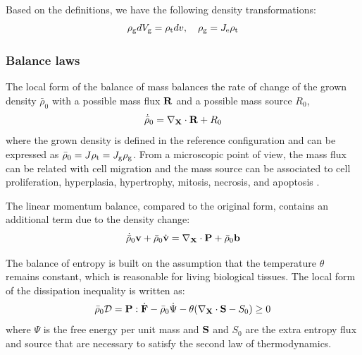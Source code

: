 Based on the definitions, we have the following density transformations:
\begin{equation} \label{eq:mass}
\rho_{\mathrm{g}} dV_{\mathrm{g}} = \rho_{\mathrm{t}} dv, \quad \rho_{\mathrm{g}} = J_{\mathrm{e}}\rho_{\mathrm{t}}
\end{equation}

\subsubsection{Balance laws}
The local form of the balance of mass balances the rate of change of the grown density ${\bar{\rho}}_0$ with 
a possible mass flux $\bold{R}$ and a possible mass source $R_0$,
\begin{equation}
\dot{\bar{\rho}}_0 = \nabla_\bold{X} \cdot \bold{R} + R_0
\end{equation}
where the grown density is defined in the reference configuration and can be expressed as $\bar{\rho}_0 = J\rho_{\mathrm{t}} = J_{\mathrm{g}} \rho_{\mathrm{g}}$. From a microscopic point of view, the mass flux can be related with cell migration and the mass source can be associated to cell proliferation, hyperplasia, hypertrophy, mitosis, necrosis, and apoptosis \cite{Menzel}.

The linear momentum balance, compared to the original form, contains an additional term due to the density change:
\begin{equation} \label{eq:momentum}
\dot{\bar{\rho}}_0 \bold{v} + {\bar{\rho}}_0\dot{\bold{v}} = \nabla_{\bold{X}} \cdot \bold{P} + {\bar{\rho}}_0\bold{b}
\end{equation}

The balance of entropy is built on the assumption that the temperature $\theta$ remains constant, which is reasonable for living biological tissues. The local form of the dissipation inequality is written as:
\begin{equation} \label{eq:entropy}
\bar{\rho}_0 \mathcal{D}= \bold{P} : \dot{\bold{F}} - \bar{\rho}_0 \dot \Psi  - \theta(\nabla_{\bold{X}} \cdot \bold{S} - S_0) \geq 0
\end{equation}
where $\Psi$ is the free energy per unit mass and $\bold{S}$ and $S_0$ are the extra entropy flux and source that are necessary to satisfy the second law of thermodynamics.

